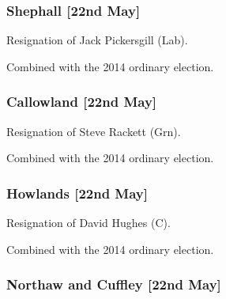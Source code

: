 \begin{resultsiii}
\subsubsection*{Shephall \hspace*{\fill}\nolinebreak[1]%
\enspace\hspace*{\fill}
[22nd May]}


Resignation of Jack Pickersgill (Lab).

Combined with the 2014 ordinary election.


\subsubsection*{Callowland \hspace*{\fill}\nolinebreak[1]%
\enspace\hspace*{\fill}
[22nd May]}


Resignation of Steve Rackett (Grn).

Combined with the 2014 ordinary election.


\subsubsection*{Howlands \hspace*{\fill}\nolinebreak[1]%
\enspace\hspace*{\fill}
[22nd May]}


Resignation of David Hughes (C).

Combined with the 2014 ordinary election.

\subsubsection*{Northaw and Cuffley \hspace*{\fill}\nolinebreak[1]%
\enspace\hspace*{\fill}
[22nd May]}



\end{resultsiii}
